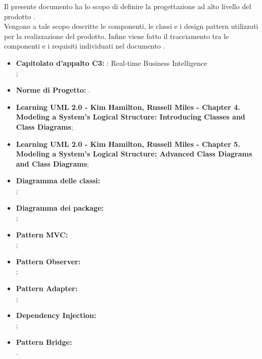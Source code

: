 
		Il presente documento ha lo scopo di definire la progettazione ad alto livello del prodotto \projectname{}.\\
		Vengono a tale scopo descritte le componenti, le classi e i design pattern utilizzati per la realizzazione del prodotto. Infine viene fatto il tracciamento tra le componenti e i requisiti individuati nel documento .

	

		\begin{itemize}
			\item\textbf{Capitolato d'appalto C3:} \projectname{}: Real-time Business Intelligence \\
				;
			\item \textbf{Norme di Progetto:} .
		\end{itemize}
		\begin{itemize}
			\item \textbf{Learning UML 2.0 - Kim Hamilton, Russell Miles - Chapter 4. Modeling a System's Logical Structure: Introducing Classes and Class Diagrams};
			\item \textbf{Learning UML 2.0 - Kim Hamilton, Russell Miles - Chapter 5. Modeling a System's Logical Structure: Advanced Class Diagrams and Class Diagrams};
			\item \textbf{Diagramma delle classi:} \\ ;
			\item \textbf{Diagramma dei package:} \\ ;
			\item \textbf{Pattern MVC:} \\ ;
			\item \textbf{Pattern Observer:} \\ ;
			\item \textbf{Pattern Adapter:} \\ ;
			\item \textbf{Dependency Injection:} \\ ;
			\item \textbf{Pattern Bridge:} \\ .
			
		\end{itemize}
